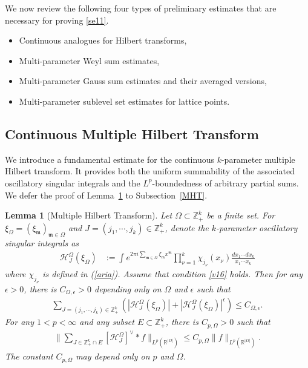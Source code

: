\documentclass[11 pt,letterpaper]{amsart}
\theoremstyle{plain}
\newtheorem{lemma}{Lemma}\numberwithin{lemma}{section}
\theoremstyle{definition}
\theoremstyle{remark} \theoremstyle{exam} \theoremstyle{ob}
\numberwithin{equation}{section}
\begin{document}
We now  review the following four types of preliminary estimates that are necessary for proving \eqref{se11}.

\begin{itemize}
	\item[3.1.] Continuous analogues for Hilbert transforms,
	
	\item[3.2.] Multi-parameter Weyl sum estimates,
	
	\item[ 3.3.] Multi-parameter Gauss sum estimates and their averaged versions,
	
	\item[3.4.] Multi-parameter sublevel set estimates for lattice points.
\end{itemize}

\subsection{Continuous Multiple Hilbert Transform}
We introduce a fundamental estimate for the continuous $k$-parameter multiple Hilbert transform. It provides both the uniform summability of the associated oscillatory singular integrals and the $L^p$-boundedness of arbitrary partial sums. We defer the proof of Lemma~\ref{po3} to Subsection~\ref{MHT}.

\begin{lemma} [Multiple Hilbert Transform]\label{po3}
	Let $\Omega\subset \mathbb Z_+^k$ be a finite set. For    $\xi_{\Omega}=(\xi_{\mathfrak{m}})_{\mathfrak{m}\in\Omega}$ and  $J=(j_1,\cdots,j_k)\in \mathbb{Z}_+^k$,  denote the $k$-parameter oscillatory singular integrals as 
	\begin{align*} 
		\mathcal{H}^{\Omega}_{J}(\xi_{\Omega})&:= \int e^{2\pi i\sum_{\mathfrak{m}\in\Omega} \xi_{\mathfrak{m}} x^{\mathfrak{m}} }\prod_{\nu=1}^k\chi_{j_\nu}(x_\nu) \frac{dx_1\cdots dx_k }{x_1\cdots x_k}
	\end{align*}
	where $\chi_{j_\nu}$ is defined in (\ref{aria}). Assume that condition \eqref{v16} holds.
	  Then for any $\epsilon>0$, there is $C_{\Omega,\epsilon} >0$ depending  only on $\Omega$ and $\epsilon$ such that
	\begin{align}\label{po4}
		\sum_{J=(j_1,\cdots,j_k)\in \mathbb{Z}_+^k} \left( |\mathcal{H}^{\Omega}_{J}(\xi_{\Omega}) |+ |\mathcal{H}^{\Omega}_{J}(\xi_{\Omega}) |^{\epsilon}\right) \le C_{\Omega,\epsilon}. 
	\end{align}
	For any $1<p<\infty$ and any subset $E\subset\mathbb{Z}_+^k$, there is $C_{p,\Omega}>0$  such that
	\begin{align}\label{poo4}
		\| \sum_{J\in \mathbb{Z}_+^k\cap E}  [\mathcal{H}^{\Omega}_{J}]^{\vee}*f \|_{L^p(\mathbb{R}^{|\Omega|})}\le C_{p,\Omega}\| f \|_{L^p(\mathbb{R}^{|\Omega|})}.
	\end{align}The constant $C_{p,\Omega}$ may depend only on  $p$ and $\Omega$.
	
\end{lemma}
\end{document}
